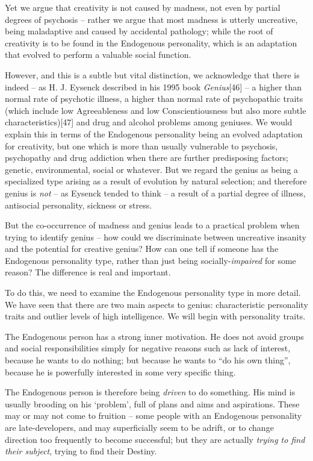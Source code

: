 \documentclass[
]{book}
\begin{document}
Yet we argue that creativity is not caused by madness, not even by partial degrees of psychosis -- rather we argue that most madness is utterly uncreative, being maladaptive and caused by accidental pathology; while the root of creativity is to be found in the Endogenous personality, which is an adaptation that evolved to perform a valuable social function.

However, and this is a subtle but vital distinction, we acknowledge that there is indeed -- as H. J. Eysenck described in his 1995 book \emph{Genius}{[}46{]} -- a higher than normal rate of psychotic illness, a higher than normal rate of psychopathic traits (which include low Agreeableness and low Conscientiousness but also more subtle characteristics){[}47{]} and drug and alcohol problems among geniuses. We would explain this in terms of the Endogenous personality being an evolved adaptation for creativity, but one which is more than usually vulnerable to psychosis, psychopathy and drug addiction when there are further predisposing factors; genetic, environmental, social or whatever. But we regard the genius as being a specialized type arising as a result of evolution by natural selection; and therefore genius is \emph{not} -- as Eysenck tended to think -- a result of a partial degree of illness, antisocial personality, sickness or stress.

But the co-occurrence of madness and genius leads to a practical problem when trying to identify genius -- how could we discriminate between uncreative insanity and the potential for creative genius? How can one tell if someone has the Endogenous personality type, rather than just being socially-\emph{impaired} for some reason? The difference is real and important.

To do this, we need to examine the Endogenous personality type in more detail. We have seen that there are two main aspects to genius: characteristic personality traits and outlier levels of high intelligence. We will begin with personality traits.

The Endogenous person has a strong inner motivation. He does not avoid groups and social responsibilities simply for negative reasons such as lack of interest, because he wants to do nothing; but because he wants to ``do his own thing'', because he is powerfully interested in some very specific thing.

The Endogenous person is therefore being \emph{driven} to do something. His mind is usually brooding on his `problem', full of plans and aims and aspirations. These may or may not come to fruition -- some people with an Endogenous personality are late-developers, and may superficially seem to be adrift, or to change direction too frequently to become successful; but they are actually \emph{trying to find their subject}, trying to find their Destiny.
\end{document}
